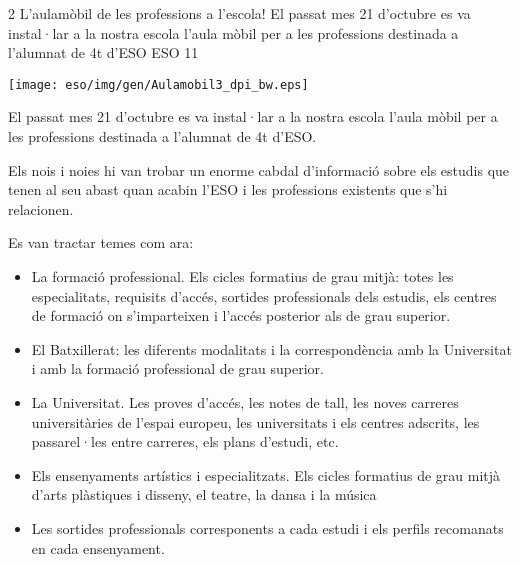 %
%
\begin{news}
{2} %
{L'aulamòbil de les professions a l'escola!}
{El passat mes 21 d’octubre es va instal·lar a la nostra escola l’aula mòbil per a les professions destinada a l’alumnat de 4t d’ESO}
{ESO}
{11} %

\noindent\texttt{[image: eso/img/gen/Aulamobil3\_dpi\_bw.eps]}

El passat mes 21 d’octubre es va instal·lar a la nostra escola l’aula mòbil per a les professions destinada a l’alumnat de 4t d’ESO.

Els nois i noies hi van trobar un enorme cabdal d’informació sobre els estudis que tenen al seu abast quan acabin l’ESO i les professions existents que s’hi relacionen.

Es van tractar temes com ara:

\begin{itemize}

	\item La formació professional. Els cicles formatius de grau mitjà: totes les especialitats, requisits d’accés, sortides professionals dels estudis, els centres de formació on s’imparteixen i l’accés posterior als de grau superior.

	\item El Batxillerat: les diferents modalitats i la correspondència amb la Universitat i amb la formació professional de grau superior.

	\item La Universitat. Les proves d’accés, les notes de tall, les noves carreres universitàries de l’espai europeu, les universitats i els centres adscrits, les passarel·les entre carreres, els plans d’estudi, etc.

	\item Els ensenyaments artístics i especialitzats. Els cicles formatius de grau mitjà d’arts plàstiques i disseny, el teatre, la dansa i la música

	\item Les sortides professionals corresponents a cada estudi i els perfils recomanats en cada ensenyament. 

\end{itemize}

\end{news}
